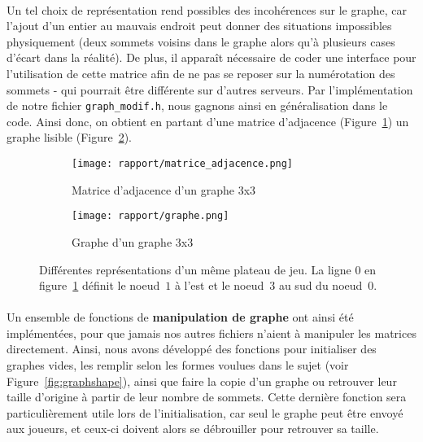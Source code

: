 \documentclass[a4paper]{article}
\begin{document}
\paragraph{}
Un tel choix de représentation rend possibles des incohérences sur le graphe, car l'ajout d'un entier au mauvais endroit peut donner des situations impossibles physiquement (deux sommets voisins dans le graphe alors qu'à plusieurs cases d'écart dans la réalité). De plus, il apparaît nécessaire de coder une interface pour l'utilisation de cette matrice afin de ne pas se reposer sur la numérotation des sommets - qui pourrait être différente sur d'autres serveurs. Par l'implémentation de notre fichier \texttt{graph\_modif.h}, nous gagnons ainsi en généralisation dans le code. Ainsi donc, on obtient en partant d'une matrice d'adjacence (Figure~\ref{fig:matrice}) un graphe lisible (Figure~\ref{fig:graphe}). \\

\begin{figure}[ht]
    \centering
    \begin{subfigure}{.5\textwidth}
        \centering
        \texttt{[image: rapport/matrice\_adjacence.png]}
        \caption{Matrice d'adjacence d'un graphe 3x3}
        \label{fig:matrice}
    \end{subfigure}%
    \begin{subfigure}{.5\textwidth}
        \centering
        \texttt{[image: rapport/graphe.png]}
        \caption{Graphe d'un graphe 3x3}
        \label{fig:graphe}
    \end{subfigure}
    
    \caption{Différentes représentations d'un même plateau de jeu. La ligne $0$ en figure~\ref{fig:matrice} définit le noeud~$1$ à l'est et le noeud~$3$ au sud du noeud~$0$.}
    \label{fig:representations}
\end{figure}

\paragraph{}
Un ensemble de fonctions de \textbf{manipulation de graphe} ont ainsi été implémentées, pour que jamais nos autres fichiers n'aient à manipuler les matrices directement. Ainsi, nous avons développé des fonctions pour initialiser des graphes vides, les remplir selon les formes voulues dans le sujet (voir Figure~\ref{fig:graphshape}), ainsi que faire la copie d'un graphe ou retrouver leur taille d'origine à partir de leur nombre de sommets. Cette dernière fonction sera particulièrement utile lors de l'initialisation, car seul le graphe peut être envoyé aux joueurs, et ceux-ci doivent alors se débrouiller pour retrouver sa taille.
\end{document}
